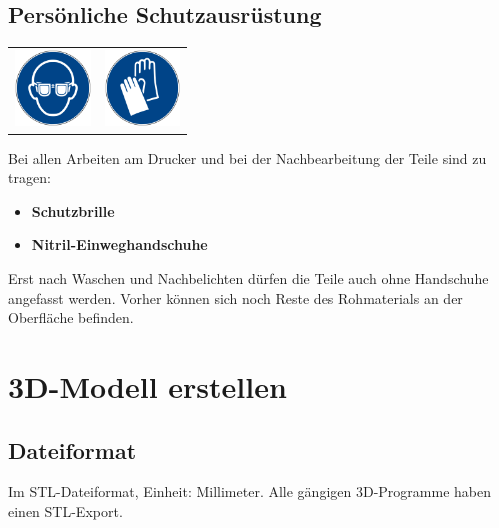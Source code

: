\documentclass{\basedir/fablab-document}
\begin{document}

\subsection{Persönliche Schutzausrüstung}


\begin{table}[h]
	\centering
	\begin{tabular}{cc}
		
	 \includegraphics[width=2cm]{bilder/gaugenschutz.png}  & \includegraphics[width=2cm]{bilder/ghandschuh.png} \\
	\end{tabular}
\end{table}

Bei allen Arbeiten am Drucker und bei der Nachbearbeitung der Teile sind zu tragen:
\begin{itemize}
	\item \textbf{Schutzbrille} 
	\item \textbf{Nitril-Einweghandschuhe}
\end{itemize}
Erst nach Waschen und Nachbelichten dürfen die Teile auch ohne Handschuhe angefasst werden. Vorher können sich noch Reste des Rohmaterials an der Oberfläche befinden.
	\newpage

	
	\renewcommand{\contentsname}{Inhaltsverzeichnis / Arbeitsablauf}
	\setcounter{tocdepth}{2}
	\tableofcontents
	\newpage
	
	\section{3D-Modell erstellen}
	
	\subsection{Dateiformat}
	
	Im STL-Dateiformat, Einheit: Millimeter. Alle gängigen 3D-Programme haben einen STL-Export.
	
\end{document}
